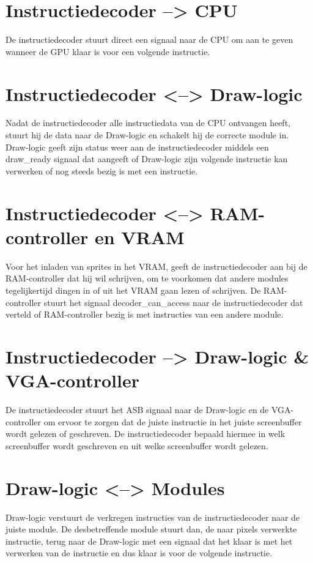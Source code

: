 \documentclass{scrartcl} %
\begin{document}
\section{Instructiedecoder --> CPU}
De instructiedecoder stuurt direct een signaal naar de CPU om aan te geven wanneer de GPU klaar is voor een volgende instructie.

\section{Instructiedecoder <--> Draw-logic}
Nadat de instructiedecoder alle instructiedata van de CPU ontvangen heeft, stuurt hij de data naar de Draw-logic en schakelt hij de correcte module in. Draw-logic geeft zijn status weer aan de instructiedecoder middels een draw\_ready signaal dat aangeeft of Draw-logic zijn volgende instructie kan verwerken of nog steeds bezig is met een instructie.

\section {Instructiedecoder <--> RAM-controller en VRAM}
Voor het inladen van sprites in het VRAM, geeft de instructiedecoder aan bij de RAM-controller dat hij wil schrijven, om te voorkomen dat andere modules tegelijkertijd dingen in of uit het VRAM gaan lezen of schrijven. De RAM-controller stuurt het signaal decoder\_can\_access naar de instructiedecoder dat verteld of RAM-controller bezig is met instructies van een andere module.

\section {Instructiedecoder --> Draw-logic \& VGA-controller}
De instructiedecoder stuurt het ASB signaal naar de Draw-logic en de VGA-controller om ervoor te zorgen dat de juiste instructie in het juiste screenbuffer wordt gelezen of geschreven. De instructiedecoder bepaald hiermee in welk screenbuffer wordt geschreven en uit welke screenbuffer wordt gelezen.

\section {Draw-logic <--> Modules}
Draw-logic verstuurt de verkregen instructies van de instructiedecoder naar de juiste module. De desbetreffende module stuurt dan, de naar pixels verwerkte instructie, terug naar de Draw-logic met een signaal dat het klaar is met het verwerken van de instructie en dus klaar is voor de volgende instructie.
\end{document}
